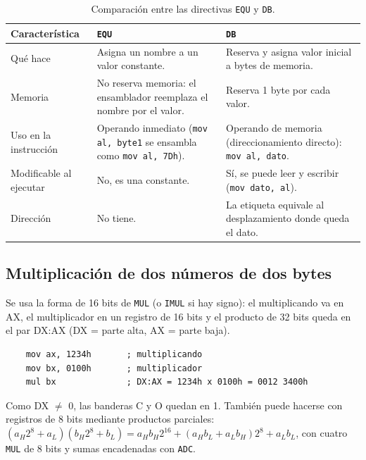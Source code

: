 \documentclass[10pt]{article}
\begin{document}
\begin{table}[htbp]
  \centering
  \caption{Comparación entre las directivas \texttt{EQU} y \texttt{DB}.}
  \label{tab:equ-db}
  \begin{tabular}{|p{3.4cm}|p{5.2cm}|p{5.2cm}|}
    \hline
    \textbf{Característica} & \textbf{\texttt{EQU}} & \textbf{\texttt{DB}} \\
    \hline
    Qué hace & Asigna un nombre a un valor constante. & Reserva y asigna valor inicial a bytes de memoria. \\
    \hline
    Memoria & No reserva memoria: el ensamblador reemplaza el nombre por el valor. & Reserva 1 byte por cada valor. \\
    \hline
    Uso en la instrucción & Operando inmediato (\texttt{mov al, byte1} se ensambla como \texttt{mov al, 7Dh}). & Operando de memoria (direccionamiento directo): \texttt{mov al, dato}. \\
    \hline
    Modificable al ejecutar & No, es una constante. & Sí, se puede leer y escribir (\texttt{mov dato, al}). \\
    \hline
    Dirección & No tiene. & La etiqueta equivale al desplazamiento donde queda el dato. \\
    \hline
  \end{tabular}
\end{table}
 
\subsection{Multiplicación de dos números de dos bytes}
 
Se usa la forma de 16 bits de \texttt{MUL} (o \texttt{IMUL} si hay signo): el multiplicando va en AX, el multiplicador en un registro de 16 bits y el producto de 32 bits queda en el par DX:AX (DX = parte alta, AX = parte baja).
 
\begin{verbatim}
    mov ax, 1234h       ; multiplicando
    mov bx, 0100h       ; multiplicador
    mul bx              ; DX:AX = 1234h x 0100h = 0012 3400h
\end{verbatim}
 
Como DX $\neq$ 0, las banderas C y O quedan en 1. También puede hacerse con registros de 8 bits mediante productos parciales: $(a_H 2^8 + a_L)(b_H 2^8 + b_L) = a_H b_H 2^{16} + (a_H b_L + a_L b_H) 2^8 + a_L b_L$, con cuatro \texttt{MUL} de 8 bits y sumas encadenadas con \texttt{ADC}.
 
\end{document}
